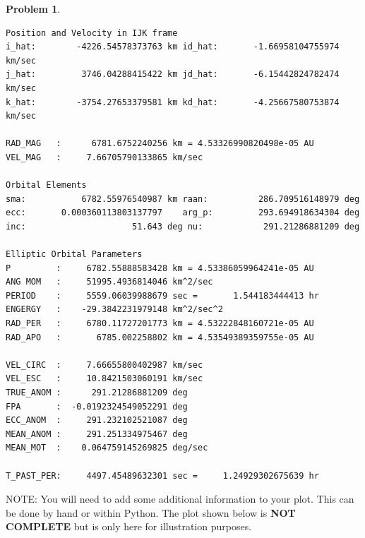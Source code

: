 \documentclass[10pt]{article}
\theoremstyle{definition}
\newtheorem{prob}{Problem}[section]
\begin{document}
\begin{prob}
\begin{verbatim}
Position and Velocity in IJK frame                                             
i_hat:        -4226.54578373763 km id_hat:       -1.66958104755974 km/sec      
j_hat:         3746.04288415422 km jd_hat:       -6.15442824782474 km/sec      
k_hat:        -3754.27653379581 km kd_hat:       -4.25667580753874 km/sec      
                                                                               
RAD_MAG   :      6781.6752240256 km = 4.53326990820498e-05 AU                  
VEL_MAG   :     7.66705790133865 km/sec                                        
                                                                               
Orbital Elements                                                               
sma:           6782.55976540987 km raan:          286.709516148979 deg         
ecc:       0.000360113803137797    arg_p:         293.694918634304 deg         
inc:                     51.643 deg nu:            291.21286881209 deg         
                                                                               
Elliptic Orbital Parameters                                                    
P         :     6782.55888583428 km = 4.53386059964241e-05 AU                  
ANG MOM   :     51995.4936814046 km^2/sec                                      
PERIOD    :     5559.06039988679 sec =       1.544183444413 hr                 
ENGERGY   :    -29.3842231979148 km^2/sec^2
RAD_PER   :     6780.11727201773 km = 4.53222848160721e-05 AU
RAD_APO   :       6785.002258802 km = 4.53549389359755e-05 AU

VEL_CIRC  :     7.66655800402987 km/sec
VEL_ESC   :     10.8421503060191 km/sec
TRUE_ANOM :      291.21286881209 deg
FPA       :  -0.0192324549052291 deg
ECC_ANOM  :     291.232102521087 deg
MEAN_ANOM :     291.251334975467 deg
MEAN_MOT  :    0.064759145269825 deg/sec

T_PAST_PER:     4497.45489632301 sec =     1.24929302675639 hr
    \end{verbatim}
\clearpage\newpage
NOTE: You will need to add some additional information to your plot. 
This can be done by hand or within Python.
The plot shown below is \textbf{NOT COMPLETE} but is only here for illustration purposes.


\end{prob}
\end{document}
